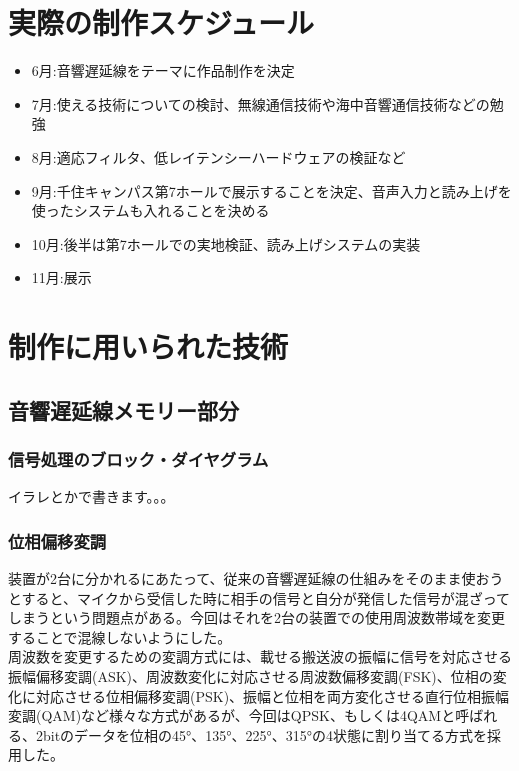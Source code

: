 \section{実際の制作スケジュール}\label{ux5b9fux969bux306eux5236ux4f5cux30b9ux30b1ux30b8ux30e5ux30fcux30eb}

\begin{itemize}
\tightlist
\item
  6月:音響遅延線をテーマに作品制作を決定
\item
  7月:使える技術についての検討、無線通信技術や海中音響通信技術などの勉強
\item
  8月:適応フィルタ、低レイテンシーハードウェアの検証など
\item
  9月:千住キャンパス第7ホールで展示することを決定、音声入力と読み上げを使ったシステムも入れることを決める
\item
  10月:後半は第7ホールでの実地検証、読み上げシステムの実装
\item
  11月:展示
\end{itemize}

\section{制作に用いられた技術}\label{ux5236ux4f5cux306bux7528ux3044ux3089ux308cux305fux6280ux8853}

\subsection{音響遅延線メモリー部分}\label{ux97f3ux97ffux9045ux5ef6ux7ddaux30e1ux30e2ux30eaux30fcux90e8ux5206}

\subsubsection{信号処理のブロック・ダイヤグラム}\label{ux4fe1ux53f7ux51e6ux7406ux306eux30d6ux30edux30c3ux30afux30c0ux30a4ux30e4ux30b0ux30e9ux30e0}

イラレとかで書きます。。。

\subsubsection{位相偏移変調}\label{ux4f4dux76f8ux504fux79fbux5909ux8abf}

装置が2台に分かれるにあたって、従来の音響遅延線の仕組みをそのまま使おうとすると、マイクから受信した時に相手の信号と自分が発信した信号が混ざってしまうという問題点がある。今回はそれを2台の装置での使用周波数帯域を変更することで混線しないようにした。\\
周波数を変更するための変調方式には、載せる搬送波の振幅に信号を対応させる振幅偏移変調(ASK)、周波数変化に対応させる周波数偏移変調(FSK)、位相の変化に対応させる位相偏移変調(PSK)、振幅と位相を両方変化させる直行位相振幅変調(QAM)など様々な方式があるが、今回はQPSK、もしくは4QAMと呼ばれる、2bitのデータを位相の45°、135°、225°、315°の4状態に割り当てる方式を採用した。

